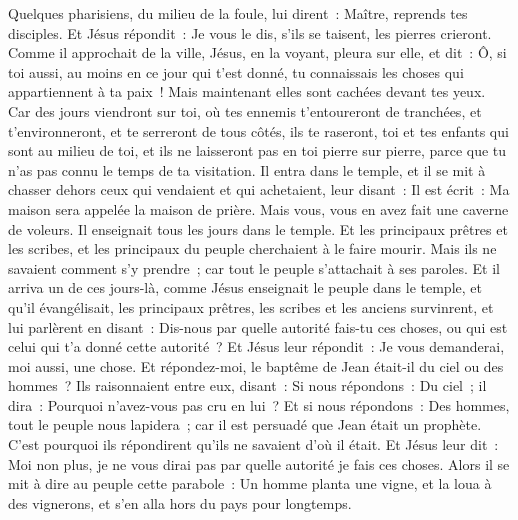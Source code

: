 \begin{multicols}{2}
Quelques pharisiens, du milieu de la foule, lui dirent~: Maître, reprends tes disciples.
Et Jésus répondit~: Je vous le dis, s'ils se taisent, les pierres crieront.
Comme il approchait de la ville, Jésus, en la voyant, pleura sur elle, et dit~:
Ô, si toi aussi, au moins en ce jour qui t'est donné, tu connaissais les choses qui appartiennent à ta paix~! Mais maintenant elles sont cachées devant tes yeux.
Car des jours viendront sur toi, où tes ennemis t'entoureront de tranchées, et t'environneront, et te serreront de tous côtés,
ils te raseront, toi et tes enfants qui sont au milieu de toi, et ils ne laisseront pas en toi pierre sur pierre, parce que tu n'as pas connu le temps de ta visitation.
Il entra dans le temple, et il se mit à chasser dehors ceux qui vendaient et qui achetaient,
leur disant~: Il est écrit~: Ma maison sera appelée la maison de prière. Mais vous, vous en avez fait une caverne de voleurs.
Il enseignait tous les jours dans le temple. Et les principaux prêtres et les scribes, et les principaux du peuple cherchaient à le faire mourir.
Mais ils ne savaient comment s'y prendre~; car tout le peuple s'attachait à ses paroles.
\VerseOne{}Et il arriva un de ces jours-là, comme Jésus enseignait le peuple dans le temple, et qu'il évangélisait, les principaux prêtres, les scribes et les anciens survinrent,
et lui parlèrent en disant~: Dis-nous par quelle autorité fais-tu ces choses, ou qui est celui qui t'a donné cette autorité~?
Et Jésus leur répondit~: Je vous demanderai, moi aussi, une chose. Et répondez-moi,
le baptême de Jean était-il du ciel ou des hommes~?
Ils raisonnaient entre eux, disant~: Si nous répondons~: Du ciel~; il dira~: Pourquoi n'avez-vous pas cru en lui~?
Et si nous répondons~: Des hommes, tout le peuple nous lapidera~; car il est persuadé que Jean était un prophète.
C'est pourquoi ils répondirent qu'ils ne savaient d'où il était.
Et Jésus leur dit~: Moi non plus, je ne vous dirai pas par quelle autorité je fais ces choses.
Alors il se mit à dire au peuple cette parabole~: Un homme planta une vigne, et la loua à des vignerons, et s'en alla hors du pays pour longtemps.

\end{multicols}
